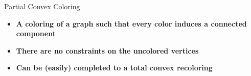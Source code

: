 \begin{frame}{Partial Convex Coloring}

\begin{itemize}
\item \textbf<1>
{A coloring of a graph such that every color induces a connected component} 

\item \textbf<2>
{There are no constraints on the uncolored vertices}

\item \textbf<3>
{Can be (easily) completed to a total convex recoloring}
   
\end{itemize}



\end{frame}

